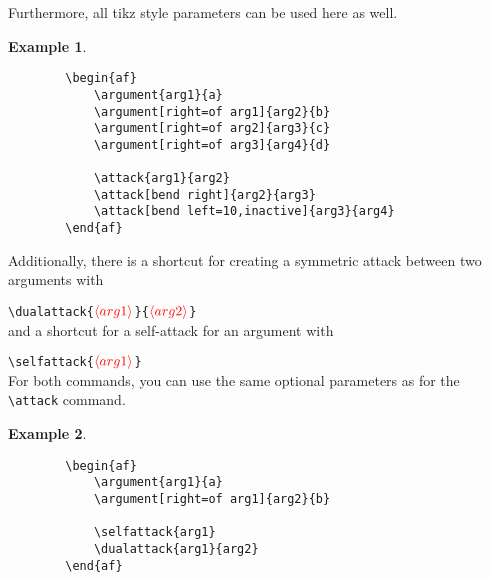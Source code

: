 \documentclass{article}
\newcommand{\opt}[2][red]{\ensuremath{\textcolor{#1}{\langle #2\rangle}}}
\newtheorem{example}{Example}
\begin{document}
    Furthermore, all \textsf{tikz} style parameters can be used here as well.

    \begin{example}~
    \begin{verbatim}
        \begin{af}
            \argument{arg1}{a}
            \argument[right=of arg1]{arg2}{b}
            \argument[right=of arg2]{arg3}{c}
            \argument[right=of arg3]{arg4}{d}
    
            \attack{arg1}{arg2}
            \attack[bend right]{arg2}{arg3}
            \attack[bend left=10,inactive]{arg3}{arg4}
        \end{af}    
    \end{verbatim}

    \begin{center}
        \begin{af}
    
        \end{af}
    \end{center}
    \end{example}

    Additionally, there is a shortcut for creating a symmetric attack between two arguments with

    \noindent
    \verb|\dualattack{|\opt{arg1}\verb|}{|\opt{arg2}\verb|}|\\

    \noindent
    and a shortcut for a self-attack for an argument with

    \noindent
    \verb|\selfattack{|\opt{arg1}\verb|}|\\

    \noindent
    For both commands, you can use the same optional parameters as for the \verb|\attack| command.

    \begin{example}~
    \begin{verbatim}
        \begin{af}
            \argument{arg1}{a}
            \argument[right=of arg1]{arg2}{b}
    
            \selfattack{arg1}
            \dualattack{arg1}{arg2}
        \end{af}    
    \end{verbatim}

    \begin{center}
        \begin{af}
    
        \end{af}
    \end{center}
    \end{example}
    
\end{document}
